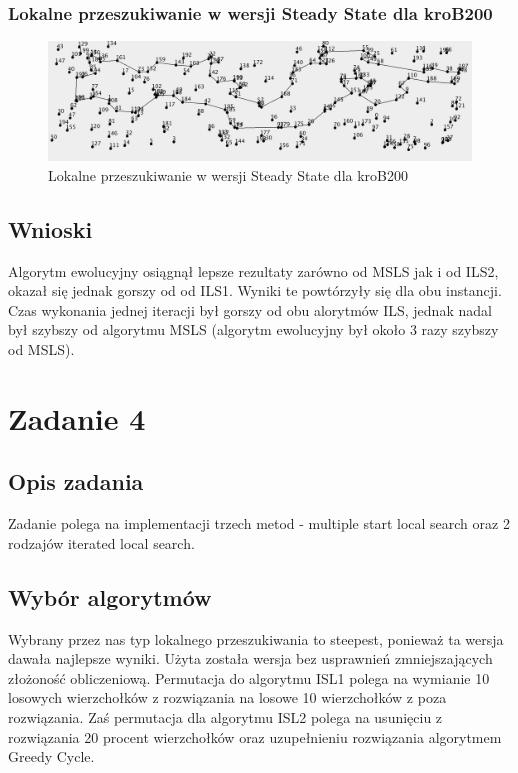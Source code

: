 \documentclass[a4paper]{article}
\begin{document}
\subsubsection{Lokalne przeszukiwanie w wersji Steady State dla kroB200}

\begin{figure}[H]
\centering
\includegraphics[width=\textwidth]{lab5/kroB_steady_state.png}
\caption{Lokalne przeszukiwanie w wersji Steady State dla kroB200}
\end{figure}

\subsection{Wnioski}

Algorytm ewolucyjny osiągnął lepsze rezultaty zarówno od MSLS jak i od ILS2, okazał się jednak gorszy od od ILS1. Wyniki te powtórzyły się dla obu instancji. Czas wykonania jednej iteracji był gorszy od obu alorytmów ILS, jednak nadal był szybszy od algorytmu MSLS (algorytm ewolucyjny był około 3 razy szybszy od MSLS).

\section{Zadanie 4}

\subsection{Opis zadania}

Zadanie polega na implementacji trzech metod - multiple start local search oraz 2 rodzajów iterated local search.

\subsection{Wybór algorytmów}
Wybrany przez nas typ lokalnego przeszukiwania to steepest, ponieważ ta wersja dawała najlepsze wyniki. Użyta została wersja bez usprawnień zmniejszających złożoność obliczeniową. Permutacja do algorytmu ISL1 polega na wymianie 10 losowych wierzchołków z rozwiązania na losowe 10 wierzchołków z poza rozwiązania.
Zaś permutacja dla algorytmu ISL2 polega na usunięciu z rozwiązania 20 procent wierzchołków oraz uzupełnieniu rozwiązania algorytmem Greedy Cycle.
\end{document}
